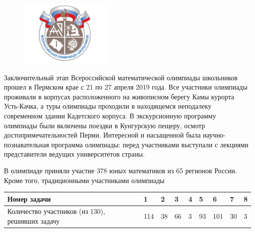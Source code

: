 \begin{multicols}{2}
	\begin{figure}[H]
		\includegraphics[width=0.4\textwidth]{pic4}
		\centering
	\end{figure}
Заключительный этап Всероссийской математической олимпиады школьников прошел в
Пермском крае с 21 по 27 апреля 2019 года. Все
участники олимпиады проживали в корпусах
расположенного на живописном берегу Камы
курорта Усть-Качка, а туры олимпиады проходили в находящемся неподалеку современном
здании Кадетского корпуса. В экскурсионную
программу олимпиады были включены поездки в Кунгурскую пещеру, осмотр достопримечательностей Перми. Интересной и насыщенной была научно-познавательная программа
олимпиады: перед участниками выступали с
лекциями представители ведущих университетов страны.

В олимпиаде приняли участие 378 юных
математиков из 65 регионов России. Кроме
того, традиционными участниками олимпиады
\begin{center}
	\begin{tabular}{|m{17mm}|m{2mm}|m{2mm}|m{2mm}|m{2mm}|m{2mm}|m{2mm}|m{2mm}|m{2mm}|}
		\hline
		Номер задачи & 1 & 2 & 3 & 4 & 5 & 6 & 7 & 8 \\	
		\hline
		Количество участников (из 130), решивших задачу & 114
		& 38 & 66 & 3 & 93 & 101 & 30 & 3 \\
		\hline
	\end{tabular}
\end{center}

\end{multicols}
